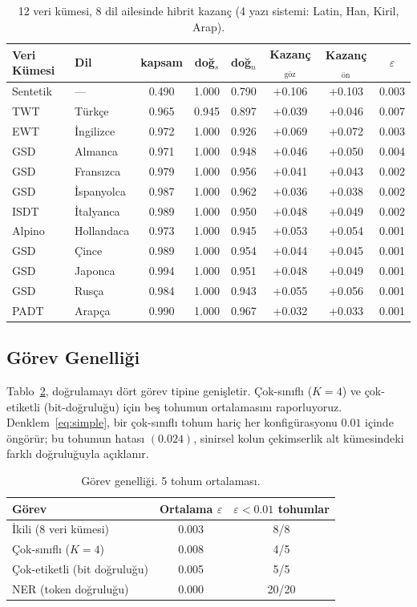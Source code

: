 \documentclass[11pt,a4paper]{article}
\begin{document}
\begin{table}[ht]
\centering
\caption{12 veri kümesi, 8 dil ailesinde hibrit kazanç (4 yazı sistemi: Latin, Han, Kiril, Arap).}
\label{tab:8dil}
\small
\begin{tabular}{llcccccc}
\toprule
Veri Kümesi & Dil & kapsam & doğ$_s$ & doğ$_n$ & Kazanç$_\text{göz}$ & Kazanç$_\text{ön}$ & $\varepsilon$ \\
\midrule
Sentetik & --- & 0.490 & 1.000 & 0.790 & +0.106 & +0.103 & 0.003 \\
TWT & Türkçe & 0.965 & 0.945 & 0.897 & +0.039 & +0.046 & 0.007 \\
EWT & İngilizce & 0.972 & 1.000 & 0.926 & +0.069 & +0.072 & 0.003 \\
GSD & Almanca & 0.971 & 1.000 & 0.948 & +0.046 & +0.050 & 0.004 \\
GSD & Fransızca & 0.979 & 1.000 & 0.956 & +0.041 & +0.043 & 0.002 \\
GSD & İspanyolca & 0.987 & 1.000 & 0.962 & +0.036 & +0.038 & 0.002 \\
ISDT & İtalyanca & 0.989 & 1.000 & 0.950 & +0.048 & +0.049 & 0.002 \\
Alpino & Hollandaca & 0.973 & 1.000 & 0.945 & +0.053 & +0.054 & 0.001 \\
GSD & Çince    & 0.989 & 1.000 & 0.954 & +0.044 & +0.045 & 0.001 \\
GSD & Japonca  & 0.994 & 1.000 & 0.951 & +0.048 & +0.049 & 0.001 \\
GSD & Rusça    & 0.984 & 1.000 & 0.943 & +0.055 & +0.056 & 0.001 \\
PADT & Arapça  & 0.990 & 1.000 & 0.967 & +0.032 & +0.033 & 0.001 \\
\bottomrule
\end{tabular}
\end{table}

\subsection{Görev Genelliği}
Tablo~\ref{tab:gorevler}, doğrulamayı dört görev tipine genişletir.
Çok-sınıflı ($K=4$) ve çok-etiketli (bit-doğruluğu) için beş tohumun
ortalamasını raporluyoruz. Denklem~\ref{eq:simple}, bir çok-sınıflı
tohum hariç her konfigürasyonu $0.01$ içinde öngörür; bu tohumun
hatası $(0.024)$, sinirsel kolun çekimserlik alt kümesindeki farklı
doğruluğuyla açıklanır.

\begin{table}[ht]
\centering
\caption{Görev genelliği. 5 tohum ortalaması.}
\label{tab:gorevler}
\small
\begin{tabular}{lcc}
\toprule
Görev & Ortalama $\varepsilon$ & $\varepsilon < 0.01$ tohumlar \\
\midrule
İkili (8 veri kümesi) & 0.003 & 8/8 \\
Çok-sınıflı ($K=4$) & 0.008 & 4/5 \\
Çok-etiketli (bit doğruluğu) & 0.005 & 5/5 \\
NER (token doğruluğu)    & 0.000 & 20/20 \\
\bottomrule
\end{tabular}
\end{table}
\end{document}
